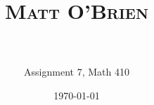 \documentclass[paper=a4, fontsize=11pt]{scrartcl} %
\title{	
\normalfont \normalsize 
\textsc{Matt O'Brien} \\ [25pt] %
\horrule{0.5pt} \\[0.4cm] %
}
\author{Assignment 7, Math 410}
\date{\normalsize\today} %
\begin{document}
\maketitle %
\begin{comment}
\begin{align*}
\int_E (f \cdot \chi A) &= \int_{E/A} (f \cdot \chi A) + \int_A (f \cdot \chi A) \text{ ,by linearity properties of the integral}.
\\  &= 0  + \int_A (f \cdot \chi A) \text{ , by definition of characteristic function}
\\  &=  \int_A (f \cdot \ 1) \text{ , by definition of characteristic function}
\end{align*} 
ok here is the cheetshee for piecewise functions
$$
f(n) =
\begin{cases}
n/2, & \text{if }n\text{ is even} \\
3n+1, & \text{if }n\text{ is odd}
\end{cases}
$$
\end{comment}
\end{document}

